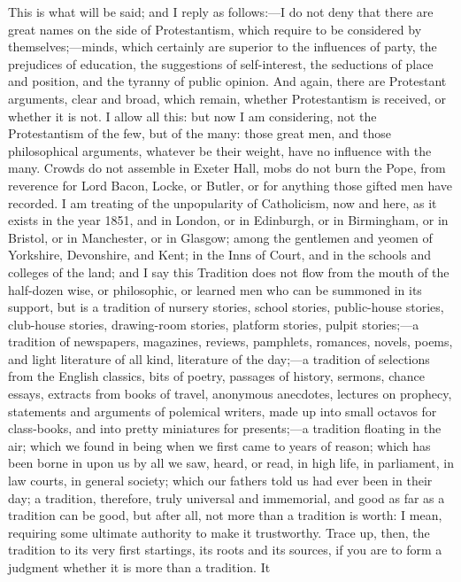This is what will be said; and I reply as
follows:—I do not deny that there are great names on
the side of Protestantism, which require to be considered
by themselves;—minds, which certainly are superior
to the influences of party, the prejudices of education,
the suggestions of self-interest, the seductions of place
and position, and the tyranny of public opinion. And
again, there are Protestant arguments, clear and broad,
which remain, whether Protestantism is received, or
whether it is not. I allow all this: but now I am
considering, not the Protestantism of the few, but of the
many: those great men, and those philosophical arguments,
whatever be their weight, have no influence with the
many. Crowds do not assemble in Exeter Hall, mobs do not
burn the Pope, from reverence for Lord Bacon, Locke, or
Butler, or for anything those gifted men have recorded. I
am treating of the unpopularity of Catholicism, now and
here, as it exists in the year 1851, and in London, or in
Edinburgh, or in Birmingham, or in Bristol, or in
Manchester, or in Glasgow; among the gentlemen and yeomen
of Yorkshire, Devonshire, and Kent; in the Inns of Court,
and in the schools and colleges of the land; and I say this Tradition does not flow from the mouth of the
half-dozen wise, or philosophic, or learned men who can
be summoned in its support, but is a tradition of nursery
stories, school stories, public-house stories, club-house
stories, drawing-room stories, platform stories, pulpit
stories;—a tradition of newspapers, magazines,
reviews, pamphlets, romances, novels, poems, and light
literature of all kind, literature of the day;—a
tradition of selections from the English classics, bits
of poetry, passages of history, sermons, chance essays,
extracts from books of travel, anonymous anecdotes,
lectures on prophecy, statements and arguments of
polemical writers, made up into small octavos for
class-books, and into pretty miniatures for
presents;—a tradition floating in the air; which we
found in being when we first came to years of reason;
which has been borne in upon us by all we saw, heard, or
read, in high life, in parliament, in law courts, in
general society; which our fathers told us had ever been
in their day; a tradition, therefore, truly universal and
immemorial, and good as far as a tradition can be good,
but after all, not more than a tradition is worth: I
mean, requiring some ultimate authority to make it
trustworthy. Trace up, then, the tradition to its very
first startings, its roots and its sources, if you are to
form a judgment whether it is more than a tradition. It
